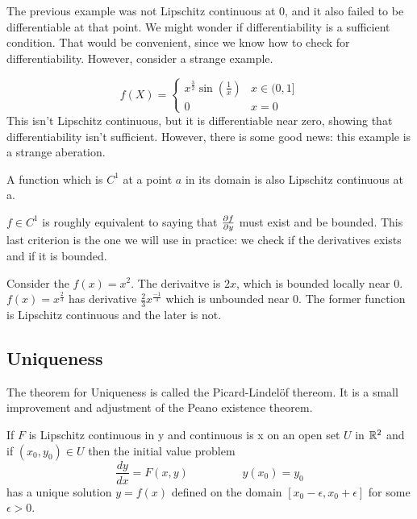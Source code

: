 \documentclass[fleqn,letterpaper]{report}
\begin{document}
The previous example was not Lipschitz continuous at $0$, and
it also failed to be differentiable at that point. We might
wonder if differentiability is a sufficient condition. That
would be convenient, since we know how to check for
differentiability. However, consider a strange
example.

\begin{example}
\begin{equation*}
f(X) = \left\{ \begin{matrix} x^{\frac{3}{2}} \sin \left(
\frac{1}{x} \right) & x \in (0,1] \\ 0 & x = 0 \end{matrix}
\right. 
\end{equation*}
This isn't Lipschitz continuous, but it is differentiable near
zero, showing that differentiability isn't sufficient.
However, there is some good news: this example
is a strange aberation. 
\end{example}

\begin{prop}
A function which is $C^1$ at a point $a$ in its domain is also
Lipschitz continuous at a.
\end{prop}

$f \in C^1$ is roughly equivalent to saying that
$\frac{\partial f}{\partial y}$ must exist and be bounded. This last
criterion is the one we will use in practice: we check if the
derivatives exists and if it is bounded.

Consider the $f(x) = x^2$. The derivaitve is $2x$,
which is bounded locally near $0$. $f(x) = x^\frac{2}{3}$ has
derivative $\frac{2}{3} x^{\frac{-1}{3}}$ which is unbounded
near 0. The former function is Lipschitz continuous and the
later is not.

\subsection{Uniqueness}
\label{uniqueness}

The theorem for Uniqueness is called the Picard-Lindel\"of
thereom. It is a small improvement and adjustment of the
Peano existence theorem. 

\begin{thm}
If $F$ is Lipschitz continuous in y
and continuous is x on an open set $U$ in $\mathbb{R}^2$ and if
$(x_0,y_0) \in U$ then the initial value problem
\begin{equation*}
\frac{dy}{dx} = F(x,y) \hspace{2cm} y(x_0) = y_0
\end{equation*}
has a unique solution $y=f(x)$ defined on the domain
$[x_0-\epsilon,x_0+\epsilon]$ for some $\epsilon > 0$. 
\end{thm}
\end{document}
